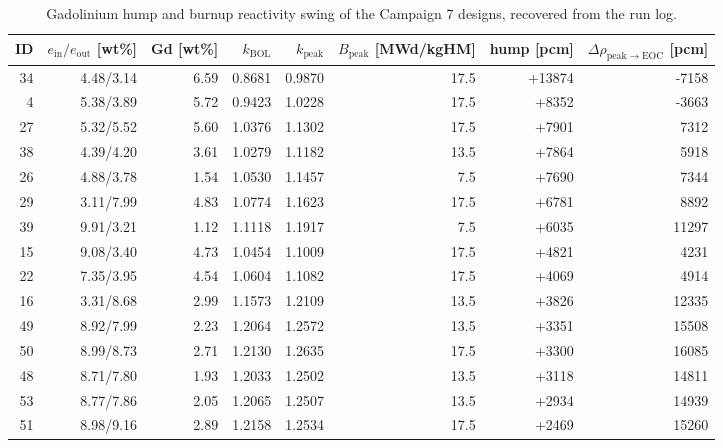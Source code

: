 \begin{table}[htbp]
  \centering
  \caption[Reactivity hump of the Campaign 7 designs]{Gadolinium hump and burnup reactivity swing of the Campaign 7 designs, recovered from the run log.}
  \label{tab:c7-hump}
  \begin{tabular}{@{}r r r r r r r r@{}}
    \toprule
    ID & $e_\mathrm{in}/e_\mathrm{out}$ [wt\%] & Gd [wt\%] & $k_\mathrm{BOL}$ & $k_\mathrm{peak}$ & $B_\mathrm{peak}$ [MWd/kgHM] & hump [pcm] & $\Delta\rho_\mathrm{peak\to EOC}$ [pcm] \\
    \midrule
    34 & 4.48/3.14 & 6.59 & 0.8681 & 0.9870 & 17.5 & +13874 & -7158 \\
    4 & 5.38/3.89 & 5.72 & 0.9423 & 1.0228 & 17.5 & +8352 & -3663 \\
    27 & 5.32/5.52 & 5.60 & 1.0376 & 1.1302 & 17.5 & +7901 & 7312 \\
    38 & 4.39/4.20 & 3.61 & 1.0279 & 1.1182 & 13.5 & +7864 & 5918 \\
    26 & 4.88/3.78 & 1.54 & 1.0530 & 1.1457 & 7.5 & +7690 & 7344 \\
    29 & 3.11/7.99 & 4.83 & 1.0774 & 1.1623 & 17.5 & +6781 & 8892 \\
    39 & 9.91/3.21 & 1.12 & 1.1118 & 1.1917 & 7.5 & +6035 & 11297 \\
    15 & 9.08/3.40 & 4.73 & 1.0454 & 1.1009 & 17.5 & +4821 & 4231 \\
    22 & 7.35/3.95 & 4.54 & 1.0604 & 1.1082 & 17.5 & +4069 & 4914 \\
    16 & 3.31/8.68 & 2.99 & 1.1573 & 1.2109 & 13.5 & +3826 & 12335 \\
    49 & 8.92/7.99 & 2.23 & 1.2064 & 1.2572 & 13.5 & +3351 & 15508 \\
    50 & 8.99/8.73 & 2.71 & 1.2130 & 1.2635 & 17.5 & +3300 & 16085 \\
    48 & 8.71/7.80 & 1.93 & 1.2033 & 1.2502 & 13.5 & +3118 & 14811 \\
    53 & 8.77/7.86 & 2.05 & 1.2065 & 1.2507 & 13.5 & +2934 & 14939 \\
    51 & 8.98/9.16 & 2.89 & 1.2158 & 1.2534 & 17.5 & +2469 & 15260 \\
    \bottomrule
  \end{tabular}
\end{table}
